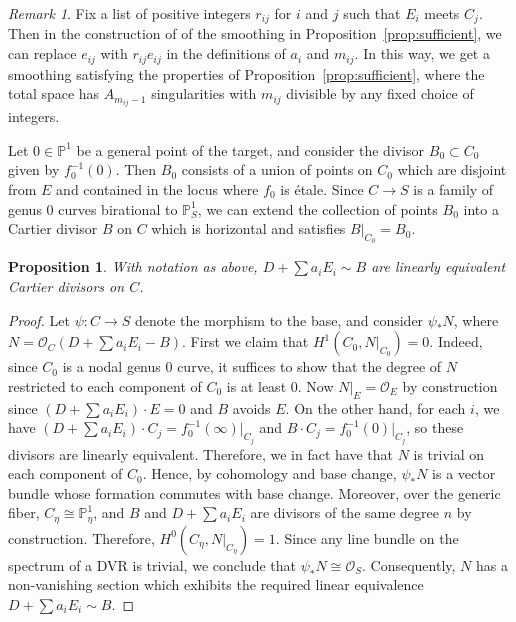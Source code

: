 \documentclass[11pt]{amsart}
\numberwithin{equation}{section}
\newtheorem{prop}[theorem]{Proposition}
\theoremstyle{definition}
\theoremstyle{remark}
\newtheorem{remark}[theorem]{Remark}
\newcommand{\bP}{{\mathbb P}}
\newcommand{\calO}{\mathcal O}
\begin{document}
\begin{remark}\label{remark:Am} Fix a list of positive integers $r_{ij}$ for $i$ and $j$ such that $E_i$ meets $C_j$. Then in the construction of of the smoothing in Proposition~\ref{prop:sufficient}, we can replace $e_{ij}$ with $r_{ij}e_{ij}$ in the definitions of $a_i$ and $m_{ij}$. In this way, we get a smoothing satisfying the properties of Proposition~\ref{prop:sufficient}, where the total space has $A_{m_{ij}-1}$ singularities with $m_{ij}$ divisible by any fixed choice of integers. 
\end{remark}

Let $0 \in \bP^1$ be a general point of the target, and consider the divisor $B_0 \subset C_0$ given by $f_0^{-1}(0)$. Then $B_0$ consists of a union of points on $C_0$ which are disjoint from $E$ and contained in the locus where $f_0$ is \'etale. Since $C \to S$ is a family of genus $0$ curves birational to $\bP^1_S$, we can extend the collection of points $B_0$ into a Cartier divisor $B$ on $C$ which is horizontal and satisfies $B|_{C_0} = B_0$. 

\begin{prop}\label{prop:linequiv2}
With notation as above, $D + \sum a_iE_i \sim B$ are linearly equivalent Cartier divisors on $C$. 
\end{prop}

\begin{proof}
  Let $\psi\colon C \to S$ denote the morphism to the base, and consider $\psi_*N$, where $N = \calO_{C}(D + \sum a_iE_i - B)$. First we claim that $H^1(C_0, N|_{C_0}) = 0$. Indeed, since $C_0$ is a nodal genus $0$ curve, it suffices to show that the degree of $N$ restricted to each component of $C_0$ is at least $0$.
  Now $N|_E = \calO_E$ by construction since $(D + \sum a_iE_i)\cdot E = 0$ and $B$ avoids $E$. On the other hand, for each $i$, we have $(D + \sum a_iE_i)\cdot C_j = f_0^{-1}(\infty)|_{C_j}$ and $B\cdot C_j = f_0^{-1}(0)|_{C_j}$, so these divisors are linearly equivalent. Therefore, we in fact have that $N$ is trivial on each component of $C_0$. Hence, by cohomology and base change, $\psi_*N$ is a vector bundle whose formation commutes with base change. Moreover, over the generic fiber, $C_\eta \cong \bP^1_\eta$, and $B$ and $D + \sum a_iE_i$ are divisors of the same degree $n$ by construction. Therefore, $H^0(C_\eta, N|_{C_\eta}) = 1$. Since any line bundle on the spectrum of a DVR is trivial, we conclude that $\psi_*N \cong \calO_S$. Consequently, $N$ has a non-vanishing section which exhibits the required linear equivalence $D+ \sum a_i E_i\sim B$. \end{proof} 
\end{document}
